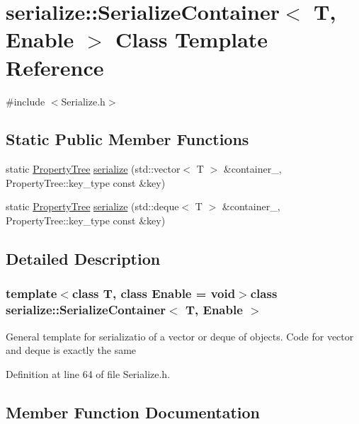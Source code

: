\hypertarget{classserialize_1_1_serialize_container}{}\section{serialize\+:\+:Serialize\+Container$<$ T, Enable $>$ Class Template Reference}
\label{classserialize_1_1_serialize_container}


{\ttfamily \#include $<$Serialize.\+h$>$}

\subsection*{Static Public Member Functions}
\begin{DoxyCompactItemize}
\item 
static \hyperlink{namespacesolar__core_adeda2737d6938c190eb774a5b2495045}{Property\+Tree} \hyperlink{classserialize_1_1_serialize_container_a38290b802d8c5a6e1e73d4c98e9f6432}{serialize} (std\+::vector$<$ T $>$ \&container\+\_\+, Property\+Tree\+::key\+\_\+type const \&key)
\item 
static \hyperlink{namespacesolar__core_adeda2737d6938c190eb774a5b2495045}{Property\+Tree} \hyperlink{classserialize_1_1_serialize_container_a8c9c697153269a2b7729d4f517479728}{serialize} (std\+::deque$<$ T $>$ \&container\+\_\+, Property\+Tree\+::key\+\_\+type const \&key)
\end{DoxyCompactItemize}


\subsection{Detailed Description}
\subsubsection*{template$<$class T, class Enable = void$>$class serialize\+::\+Serialize\+Container$<$ T, Enable $>$}

General template for serializatio of a vector or deque of objects. Code for vector and deque is exactly the same 

Definition at line 64 of file Serialize.\+h.



\subsection{Member Function Documentation}
\hypertarget{classserialize_1_1_serialize_container_a38290b802d8c5a6e1e73d4c98e9f6432}{}
